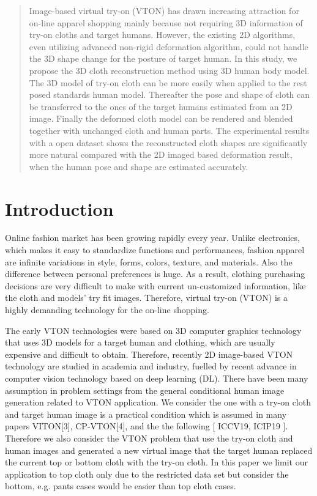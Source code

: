 \documentclass[runningheads]{llncs}
\begin{document}
\begin{abstract}

Image-based virtual try-on (VTON) has drawn increasing attraction for on-line apparel shopping mainly because not requiring 3D information of try-on cloths and target humans. However, the existing 2D algorithms, even utilizing advanced non-rigid deformation algorithm, could not handle the 3D shape change for the posture of target human. In this study, we propose  the 3D cloth reconstruction method using 3D human body model. The 3D model of try-on cloth can be more easily when applied to the rest posed standards human model. Thereafter the pose and shape of cloth can be transferred to the ones of the target humans estimated from an 2D image. Finally the deformed cloth model can be rendered and blended together with unchanged cloth and human parts. The experimental results with a open dataset shows the reconstructed cloth shapes are significantly more natural compared with the 2D imaged based deformation result, when the human pose and shape are estimated accurately.         

\end{abstract}


\section{Introduction}

Online fashion market has been growing rapidly every year. Unlike electronics, which makes it easy to standardize functions and performances, fashion apparel are infinite variations in   style, forms, colors, texture, and materials.  Also the difference between personal preferences is huge. As a result, clothing purchasing decisions are very difficult to make with current un-customized information, like the cloth and models' try fit images. Therefore, virtual try-on (VTON) is a highly demanding technology for the on-line shopping. 

The early VTON technologies were based on 3D computer graphics technology that uses 3D models for a target human and clothing, which are usually expensive and difficult to obtain. Therefore, recently 2D image-based VTON technology are studied in academia and industry, fuelled by recent advance in computer vision technology based on deep learning (DL).
There have been many assumption in problem settings from the general conditional human image generation related to VTON application. We consider the one with a try-on cloth and target human image is a practical condition which is assumed in many papers  VITON[3], CP-VTON[4], and the the following [ ICCV19, ICIP19 ]. Therefore we also consider the VTON problem that use the try-on cloth and human images and generated a new virtual image that the target human replaced the current top or bottom cloth with the try-on cloth. In this paper we limit our application to top cloth only due to the restricted data set but consider the bottom, e.g. pants cases would be easier than top cloth cases.
\end{document}
